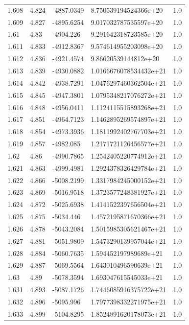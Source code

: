 \begin{tabular}{lllll}
1.608 & 4.824 & -4887.0349 & 8.750539194524366e+20 & 1.0 \\
1.609 & 4.827 & -4895.6254 & 9.017032787535597e+20 & 1.0 \\
1.61 & 4.83 & -4904.226 & 9.291642318723585e+20 & 1.0 \\
1.611 & 4.833 & -4912.8367 & 9.574614955203098e+20 & 1.0 \\
1.612 & 4.836 & -4921.4574 & 9.86620539144812e+20 & 1.0 \\
1.613 & 4.839 & -4930.0882 & 1.0166676078534432e+21 & 1.0 \\
1.614 & 4.842 & -4938.7291 & 1.0476297460362504e+21 & 1.0 \\
1.615 & 4.845 & -4947.3801 & 1.0795348217076272e+21 & 1.0 \\
1.616 & 4.848 & -4956.0411 & 1.1124115515893268e+21 & 1.0 \\
1.617 & 4.851 & -4964.7123 & 1.1462895269574897e+21 & 1.0 \\
1.618 & 4.854 & -4973.3936 & 1.1811992402767703e+21 & 1.0 \\
1.619 & 4.857 & -4982.085 & 1.2171721126456577e+21 & 1.0 \\
1.62 & 4.86 & -4990.7865 & 1.2542405220774912e+21 & 1.0 \\
1.621 & 4.863 & -4999.4981 & 1.2924378326429784e+21 & 1.0 \\
1.622 & 4.866 & -5008.2199 & 1.3317984245000152e+21 & 1.0 \\
1.623 & 4.869 & -5016.9518 & 1.3723577248381927e+21 & 1.0 \\
1.624 & 4.872 & -5025.6938 & 1.4141522397656504e+21 & 1.0 \\
1.625 & 4.875 & -5034.446 & 1.4572195871670366e+21 & 1.0 \\
1.626 & 4.878 & -5043.2084 & 1.5015985305621467e+21 & 1.0 \\
1.627 & 4.881 & -5051.9809 & 1.5473290139957044e+21 & 1.0 \\
1.628 & 4.884 & -5060.7635 & 1.594452197989689e+21 & 1.0 \\
1.629 & 4.887 & -5069.5564 & 1.643010496590639e+21 & 1.0 \\
1.63 & 4.89 & -5078.3594 & 1.693047615545033e+21 & 1.0 \\
1.631 & 4.893 & -5087.1726 & 1.7446085916375722e+21 & 1.0 \\
1.632 & 4.896 & -5095.996 & 1.7977398332271975e+21 & 1.0 \\
1.633 & 4.899 & -5104.8295 & 1.8524891620178073e+21 & 1.0 \\

\end{tabular}
